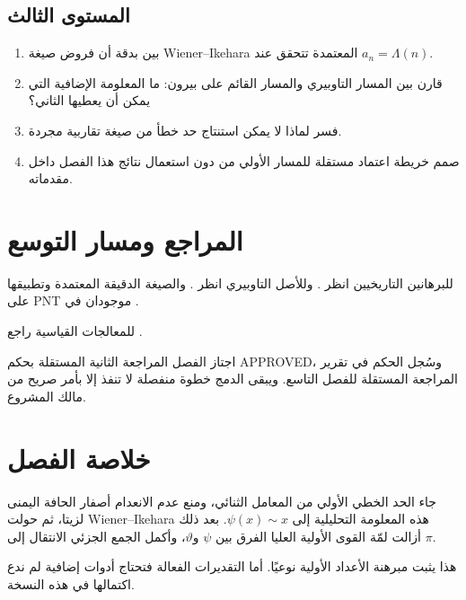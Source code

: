 \subsection{المستوى الثالث}
\begin{enumerate}
  \item بين بدقة أن فروض صيغة Wiener--Ikehara المعتمدة تتحقق عند
  \(a_n=\Lambda(n)\).
  \item قارن بين المسار التاوبيري والمسار القائم على بيرون: ما المعلومة
  الإضافية التي يمكن أن يعطيها الثاني؟
  \item فسر لماذا لا يمكن استنتاج حد خطأ من صيغة تقاربية مجردة.
  \item صمم خريطة اعتماد مستقلة للمسار الأولي من دون استعمال نتائج هذا
  الفصل داخل مقدماته.
\end{enumerate}

\section{المراجع ومسار التوسع}

للبرهانين التاريخيين انظر
\cite{Hadamard1896,DeLaValleePoussin1896}. وللأصل التاوبيري انظر
\cite{Wiener1930,Ikehara1931}. والصيغة الدقيقة المعتمدة وتطبيقها على PNT
موجودان في
\cite[Theorem 1.1 والقسم 2، الصفحات 1107--1109]{Korevaar2006}.

للمعالجات القياسية راجع
\cite{Apostol1976,Davenport2000,MontgomeryVaughan2007,
IwaniecKowalski2004,Tenenbaum2015,Titchmarsh1986}.

اجتاز الفصل المراجعة الثانية المستقلة بحكم \textenglish{APPROVED}،
وسُجل الحكم في تقرير المراجعة المستقلة للفصل التاسع. ويبقى الدمج خطوة
منفصلة لا تنفذ إلا بأمر صريح من مالك المشروع.

\section{خلاصة الفصل}

جاء الحد الخطي الأولي من المعامل الثنائي، ومنع عدم الانعدام أصفار الحافة
اليمنى لزيتا، ثم حولت Wiener--Ikehara هذه المعلومة التحليلية إلى
\(\psi(x)\sim x\). بعد ذلك أزالت لمّة القوى الأولية العليا الفرق بين
\(\psi\) و\(\vartheta\)، وأكمل الجمع الجزئي الانتقال إلى \(\pi\).

هذا يثبت مبرهنة الأعداد الأولية نوعيًا. أما التقديرات الفعالة فتحتاج أدوات
إضافية لم ندع اكتمالها في هذه النسخة.
